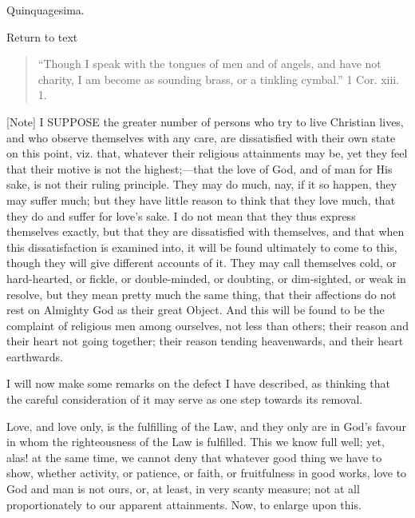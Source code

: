 
Quinquagesima.

Return to text


\begin{quote}

``Though I speak with the tongues of men and of angels, and
have not charity, I am become as sounding brass, or a tinkling
cymbal.'' 1 Cor. xiii. 1.

\end{quote}

[Note] I SUPPOSE the greater
number of persons who try to live Christian lives, and who observe
themselves with any care, are dissatisfied with their own state on
this point, viz. that, whatever their religious attainments may be,
yet they feel that their motive is not the highest;—that the love of
God, and of man for His sake, is not their ruling principle. They may
do much, nay, if it so happen, they may suffer much; but they have
little reason to think that they love much, that they do and suffer
for love's sake. I do not mean that they thus express themselves
exactly, but that they are dissatisfied with themselves, and that when
this dissatisfaction is examined into, it will be found ultimately to
come to this, though they will give different accounts of it. They may
call themselves cold, or hard-hearted, or fickle, or double-minded, or
doubting, or dim-sighted, or weak in resolve, but they mean pretty
much the same thing, that their affections do not rest on Almighty God
as their great Object. And this will be found to be the complaint of
religious men among ourselves, not less than others; their reason and
their heart not going together; their reason tending heavenwards, and
their heart earthwards.

I will now make some remarks on the defect I have described, as
thinking that the careful consideration of it may serve as one step
towards its removal.

Love, and love only, is the fulfilling of the Law, and they only
are in God's favour in whom the righteousness of the Law is fulfilled.
This we know full well; yet, alas! at the same time, we cannot deny
that whatever good thing we have to show, whether activity, or
patience, or faith, or fruitfulness in good works, love to God and man
is not ours, or, at least, in very scanty measure; not at all
proportionately to our apparent attainments. Now, to enlarge upon
this.

